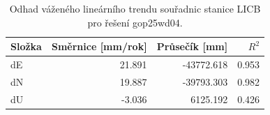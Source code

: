 \begin{table}[htbp]
\caption{Odhad váženého lineárního trendu souřadnic stanice LICB pro řešení gop25wd04.}
\label{tab:gop25wd04_stcd_licb_weighted_1seg}
\begin{tabular}{lrrr}
\toprule
Složka & Směrnice [mm/rok] & Průsečík [mm] & $R^2$ \\
\midrule
dE & 21.891 & -43772.618 & 0.953 \\
dN & 19.887 & -39793.303 & 0.982 \\
dU & -3.036 & 6125.192 & 0.426 \\
\bottomrule
\end{tabular}
\end{table}
